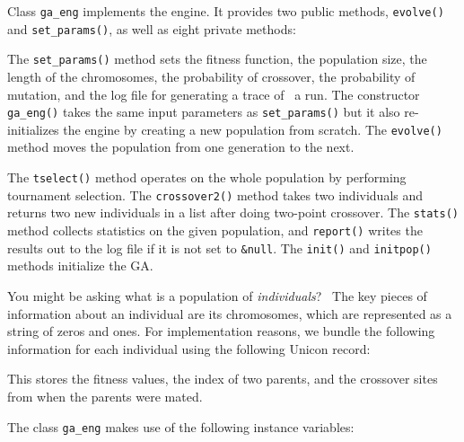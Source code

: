 Class \texttt{ga\_eng} implements the engine. It provides
two public methods, \texttt{evolve()} and \texttt{set\_params()}, as
well as eight private methods: 


The \texttt{set\_params()} method sets the fitness function, the
population size, the length of the chromosomes, the probability of
crossover, the probability of mutation, and the log file for generating
a trace of \ a run. The constructor
\texttt{ga\_eng()} takes the same input parameters as
\texttt{set\_params()} but it also re-initializes the engine by
creating a new population from scratch. The \texttt{evolve()} method
moves the population from one generation to the next.

The \texttt{tselect()} method operates on the whole population by
performing tournament selection. The \texttt{crossover2()} method takes
two individuals and returns two new individuals in a list after doing
two-point crossover. The \texttt{stats()} method collects statistics on
the given population, and \texttt{report()} writes the results out to
the log file if it is not set to \texttt{\&null}. The \texttt{init()}
and \texttt{initpop()} methods initialize the GA.

You might be asking what is a population of \textit{individuals}? \ The
key pieces of information about an individual are its chromosomes,
which are represented as a string of zeros and ones. For implementation
reasons, we bundle the following information for each individual using
the following Unicon record: 


This stores the fitness values, the index of two parents, and the
crossover sites from when the parents were mated.

The class \texttt{ga\_eng} makes use of the following
instance variables: 

